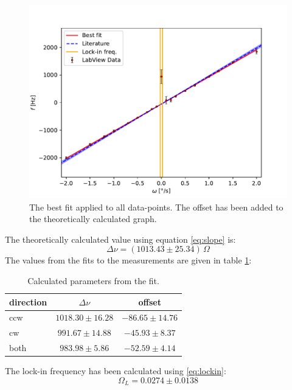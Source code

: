 \begin{figure}[h!]
    \centering
    \includegraphics[width=\textwidth]{Gyroscope/Report/plots/slope.pdf}
    \caption{The best fit applied to all data-points. The offset has been added to the theoretically calculated graph.}
    \label{fig:measurements}
\end{figure}
The theoretically calculated value using equation \ref{eq:slope} is:
$$\Delta \nu = (1013.43 \pm 25.34)\, \Omega $$
The values from the fits to the measurements are given in table \ref{tab:measurements}:
\begin{table}[h!]
\centering\begin{tabular}{l|c|c}
\hline direction & $\Delta \nu$ & offset \\ \hline
     ccw & $1018.30 \pm 16.28$ & $-86.65 \pm 14.76$\\
     cw & $991.67 \pm 14.88$ & $-45.93 \pm 8.37$ \\
     both & $983.98 \pm 5.86$ & $-52.59 \pm 4.14$
\end{tabular}
\caption{Calculated parameters from the fit.}
\label{tab:measurements}
\end{table}

The lock-in frequency has been calculated using \ref{eq:lockin}:
$$ \Omega_L = 0.0274 \pm 0.0138 $$